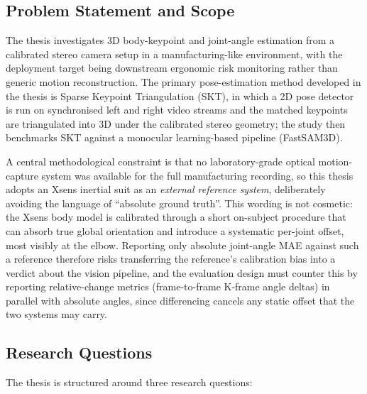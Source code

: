 \documentclass[12pt,a4paper]{article}
\begin{document}
\subsection{Problem Statement and Scope}

The thesis investigates 3D body-keypoint and joint-angle estimation from a
calibrated stereo camera setup in a manufacturing-like environment, with the
deployment target being downstream ergonomic risk monitoring rather than
generic motion reconstruction.
The primary pose-estimation method developed in the thesis is Sparse
Keypoint Triangulation (SKT), in which a 2D pose detector is run on
synchronised left and right video streams and the matched keypoints are
triangulated into 3D under the calibrated stereo geometry; the study then
benchmarks SKT against a monocular learning-based pipeline (FastSAM3D).

A central methodological constraint is that no laboratory-grade optical
motion-capture system was available for the full manufacturing recording, so
this thesis adopts an Xsens inertial suit as an \emph{external reference
system}, deliberately avoiding the language of ``absolute ground truth''.
This wording is not cosmetic: the Xsens body model is calibrated through a
short on-subject procedure that can absorb true global orientation and
introduce a systematic per-joint offset, most visibly at the elbow.
Reporting only absolute joint-angle MAE against such a reference therefore
risks transferring the reference's calibration bias into a verdict about the
vision pipeline, and the evaluation design must counter this by reporting
relative-change metrics (frame-to-frame K-frame angle deltas) in parallel
with absolute angles, since differencing cancels any static offset that the
two systems may carry.

\subsection{Research Questions}

The thesis is structured around three research questions:
\end{document}
